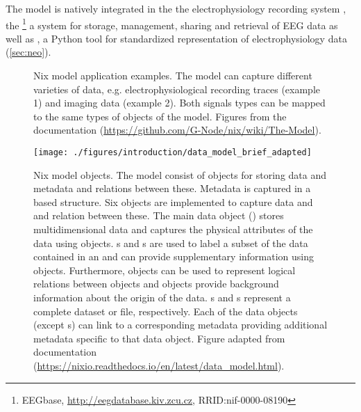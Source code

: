 The  model is natively integrated in the the electrophysiology recording system , the \footnote{EEGbase, \url{http://eegdatabase.kiv.zcu.cz}, RRID:nif-0000-08190} a system for storage, management, sharing and retrieval of EEG data as well as , a Python tool for standardized representation of electrophysiology data (\ref{sec:neo}).


\begin{figure}
 \centering
 \scalebox{0.45}{
 }
 \caption[Nix model application examples]{Nix model application examples. The model can capture different varieties of data, e.g. electrophysiological recording traces (example 1) and imaging data (example 2). Both signals types can be mapped to the same types of objects of the  model. Figures from  the documentation (\url{https://github.com/G-Node/nix/wiki/The-Model}).}
 \label{fig:intro_nix_examples}
\end{figure}

\begin{figure}
 \texttt{[image: ./figures/introduction/data\_model\_brief\_adapted]}
 \caption[Nix model objects]{Nix model objects. The model consist of objects for storing data and metadata and relations between these. Metadata is captured in a  based structure. Six objects are implemented to capture data and and relation between these. The main data object () stores multidimensional data and captures the physical attributes of the data using  objects. s and s are used to label a subset of the data contained in an  and can provide supplementary information using  objects. Furthermore,  objects can be used to represent logical relations between objects and  objects provide background information about the origin of the data. s and s represent a complete dataset or file, respectively. Each of the data objects (except s) can link to a corresponding metadata  providing additional metadata specific to that data object. Figure adapted from  documentation (\url{https://nixio.readthedocs.io/en/latest/data_model.html}).}
 \label{fig:intro_nix_model}
\end{figure}

